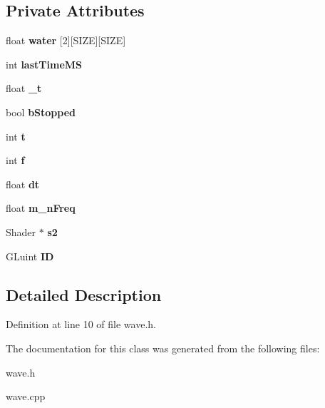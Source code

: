 \subsection*{Private Attributes}
\begin{DoxyCompactItemize}
\item 
float {\bfseries water} [2][S\-I\-Z\-E][S\-I\-Z\-E]\label{classWaveRenderDemo_1_1Wave_af992c3ed19950445f2931acb3fac19ce}

\item 
int {\bfseries last\-Time\-M\-S}\label{classWaveRenderDemo_1_1Wave_a97b6b3b892b7ed78b684345d113f448c}

\item 
float {\bfseries \-\_\-t}\label{classWaveRenderDemo_1_1Wave_a152d989e30b1e06cc372f85990669517}

\item 
bool {\bfseries b\-Stopped}\label{classWaveRenderDemo_1_1Wave_aabd2bc7ec09a367c904fa6439b9f8482}

\item 
int {\bfseries t}\label{classWaveRenderDemo_1_1Wave_a95ca1e63cd0aa22551c05e35dc601ea7}

\item 
int {\bfseries f}\label{classWaveRenderDemo_1_1Wave_a7b1fface16c60dcdb5b622c892bb9aa5}

\item 
float {\bfseries dt}\label{classWaveRenderDemo_1_1Wave_a8f4a4a23e0d8285ea09474a350f68006}

\item 
float {\bfseries m\-\_\-n\-Freq}\label{classWaveRenderDemo_1_1Wave_a9cfd0400554ce11f8ba19220458b53bd}

\item 
Shader $\ast$ {\bfseries s2}\label{classWaveRenderDemo_1_1Wave_ac87d420d940cc07da750b77e446be029}

\item 
G\-Luint {\bfseries I\-D}\label{classWaveRenderDemo_1_1Wave_a53b15734251a56a7b93d58c28a9422a8}

\end{DoxyCompactItemize}


\subsection{Detailed Description}


Definition at line 10 of file wave.\-h.



The documentation for this class was generated from the following files\-:\begin{DoxyCompactItemize}
\item 
wave.\-h\item 
wave.\-cpp\end{DoxyCompactItemize}
